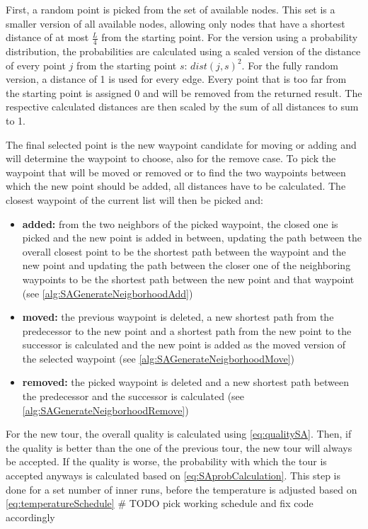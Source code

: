 First, a random point is picked from the set of available nodes.
This set is a smaller version of all available nodes, allowing only nodes that have a shortest distance of at most $\frac{L}{4}$ from the starting point. 
For the version using a probability distribution, the probabilities are calculated using a scaled version of the distance of every point $j$ from the starting point $s$: $dist(j,s)^2$.
For the fully random version, a distance of 1 is used for every edge.
Every point that is too far from the starting point is assigned 0 and will be removed from the returned result.
The respective calculated distances are then scaled by the sum of all distances to sum to 1.

The final selected point is the new waypoint candidate for moving or adding and will determine the waypoint to choose, also for the remove case.
To pick the waypoint that will be moved or removed or to find the two waypoints between which the new point should be added, all distances have to be calculated.
The closest waypoint of the current list will then be picked and:

\begin{itemize}
	\item \textbf{added:} from the two neighbors of the picked waypoint, the closed one is picked and the new point is added in between, updating the path between the overall closest point to be the shortest path between the waypoint and the new point and updating the path between the closer one of the neighboring waypoints to be the shortest path between the new point and that waypoint (see \ref{alg:SAGenerateNeigborhoodAdd})
	\item \textbf{moved:} the previous waypoint is deleted, a new shortest path from the predecessor to the new point and a shortest path from the new point to the successor is calculated and the new point is added as the moved version of the selected waypoint (see \ref{alg:SAGenerateNeigborhoodMove})
	\item \textbf{removed:} the picked waypoint is deleted and a new shortest path between the predecessor and the successor is calculated (see \ref{alg:SAGenerateNeigborhoodRemove})
\end{itemize}

For the new tour, the overall quality is calculated using \ref{eq:qualitySA}. 
Then, if the quality is better than the one of the previous tour, the new tour will always be accepted.
If the quality is worse, the probability with which the tour is accepted anyways is calculated based on \ref{eq:SAprobCalculation}. 
This step is done for a set number of inner runs, before the temperature is adjusted based on \ref{eq:temperatureSchedule} \# TODO pick working schedule and fix code accordingly

